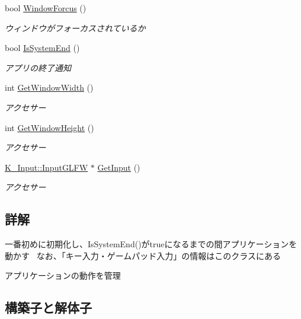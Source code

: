 \begin{DoxyCompactItemize}
bool \mbox{\hyperlink{class_k___system_1_1_system_class_ab36bf9672ef9967b829b95da744c5394}{Window\+Forcus}} ()
\begin{DoxyCompactList}\small\item\em ウィンドウがフォーカスされているか \end{DoxyCompactList}\item 
bool \mbox{\hyperlink{class_k___system_1_1_system_class_a5c776515e01bcba724c6fa64db4897c0}{Is\+System\+End}} ()
\begin{DoxyCompactList}\small\item\em アプリの終了通知 \end{DoxyCompactList}\item 
int \mbox{\hyperlink{class_k___system_1_1_system_class_a8b1226fbf696428544adfa890430cac1}{Get\+Window\+Width}} ()
\begin{DoxyCompactList}\small\item\em アクセサー \end{DoxyCompactList}\item 
int \mbox{\hyperlink{class_k___system_1_1_system_class_a77b2bd403ce58a63f48151054ee2402e}{Get\+Window\+Height}} ()
\begin{DoxyCompactList}\small\item\em アクセサー \end{DoxyCompactList}\item 
\mbox{\hyperlink{class_k___input_1_1_input_g_l_f_w}{K\+\_\+\+Input\+::\+Input\+G\+L\+FW}} $\ast$ \mbox{\hyperlink{class_k___system_1_1_system_class_ac4f7977cb0325fe9ac581ed1942404a0}{Get\+Input}} ()
\begin{DoxyCompactList}\small\item\em アクセサー \end{DoxyCompactList}\end{DoxyCompactItemize}


\subsection{詳解}
一番初めに初期化し、\+Is\+System\+End()がtrueになるまでの間アプリケーションを動かす~\newline
なお、「キー入力・ゲームパッド入力」の情報はこのクラスにある 

アプリケーションの動作を管理 

\subsection{構築子と解体子}
\mbox{\label{class_k___system_1_1_system_class_a0202cc960e52ef4b51f0decb3c3fb35d}} 
